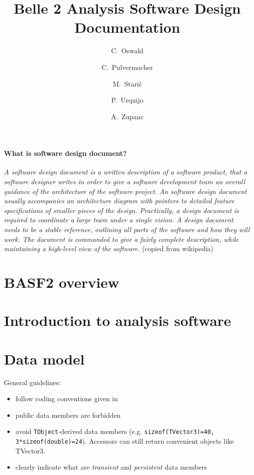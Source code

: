 \documentclass[a4paper,11pt]{article}
\title{\boldmath Belle 2 Analysis Software Design Documentation}
\author[a]{C.~Oswald}
\author[b]{C.~Pulvermacher}
\author[c]{M.~Stari\v{c}}
\author[a]{P.~Urquijo}
\author[b]{A.~Zupanc}
\affiliation[a]{University of Bonn, Bonn, Germany}
\affiliation[b]{Karlsruhe Institute Of Technology, Karlsruhe, Germany}
\affiliation[c]{Jo\v{z}ef Stefan Institute, Ljubljana, Slovenia}
\begin{document}
 
\maketitle
\flushbottom

\paragraph{What is software design document?}

{\it A software design document is a written description of a software product, that a software designer 
writes in order to give a software development team an overall guidance of the architecture of the software 
project. An software design document usually accompanies an architecture diagram with pointers to detailed 
feature specifications of smaller pieces of the design. Practically, a design document is required to coordinate 
a large team under a single vision. A design document needs to be a stable reference, outlining all parts of 
the software and how they will work. The document is commanded to give a fairly complete description, while 
maintaining a high-level view of the software.} (copied from wikipedia)

\section{BASF2 overview}


\section{Introduction to analysis software}


\section{Data model}

General guidelines:
\begin{itemize}
 \item follow coding conventions given in \cite{basf2:coding:convention}
 \item public data members are forbidden
 \item avoid {\tt TObject}-derived data members (e.g. {\tt sizeof(TVector3)=40, 3*sizeof(double)=24}). Accessors can still return 
  convenient objects like TVector3. 
 \item clearly indicate what are {\it transient} and {\it persistent} data members
\end{itemize}
    
\end{document}
